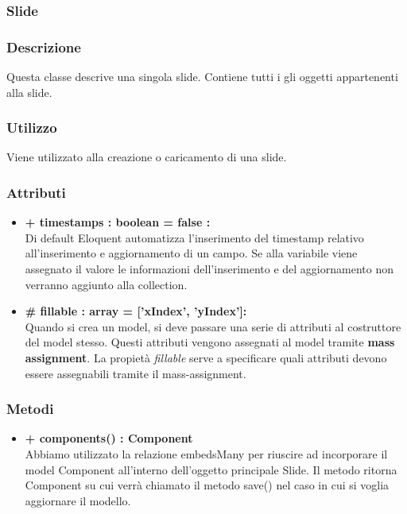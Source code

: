 \subsubsection{Slide}


	\subsubsection*{Descrizione}
	Questa classe descrive una singola slide. Contiene tutti i gli oggetti appartenenti alla slide.
	
	\subsubsection*{Utilizzo}
Viene utilizzato alla creazione o caricamento di una slide.

	\subsubsection*{Attributi}
	\begin{itemize}
		\item \textbf{+ timestamps : boolean = false :}\\
		Di default Eloquent automatizza l'inserimento del timestamp relativo all'inserimento e aggiornamento di un campo. Se alla variabile viene assegnato il valore le informazioni dell'inserimento e del aggiornamento non verranno aggiunto alla collection.
		\item \textbf{\# fillable : array = [’xIndex’, ’yIndex']:}\\
		Quando si crea un model, si deve passare una serie di attributi al costruttore del model stesso. Questi attributi vengono assegnati al model tramite \textbf{mass assignment}. La propietà \textit{fillable} serve a specificare quali attributi devono essere assegnabili tramite il mass-assignment.
	\end{itemize}
	\subsubsection*{Metodi}
	\begin{itemize}
		\item \textbf{+ components() : Component}\\
		Abbiamo utilizzato la relazione embedsMany per riuscire ad incorporare il model Component all’interno dell’oggetto principale Slide. Il metodo ritorna Component su cui verrà chiamato il metodo save() nel caso in cui si voglia aggiornare il modello.
	\end{itemize}
\newpage

